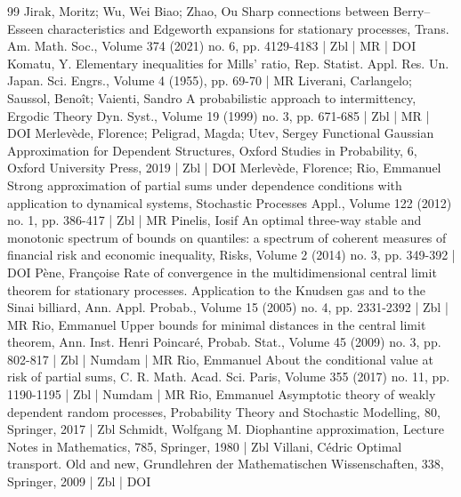 \begin{thebibliography}{99}
 Jirak, Moritz; Wu, Wei Biao; Zhao, Ou Sharp connections between Berry–Esseen characteristics and Edgeworth expansions for stationary processes, Trans. Am. Math. Soc., Volume 374 (2021) no. 6, pp. 4129-4183 | Zbl | MR | DOI
 Komatu, Y. Elementary inequalities for Mills’ ratio, Rep. Statist. Appl. Res. Un. Japan. Sci. Engrs., Volume 4 (1955), pp. 69-70 | MR
 Liverani, Carlangelo; Saussol, Benoît; Vaienti, Sandro A probabilistic approach to intermittency, Ergodic Theory Dyn. Syst., Volume 19 (1999) no. 3, pp. 671-685 | Zbl | MR | DOI
 Merlevède, Florence; Peligrad, Magda; Utev, Sergey Functional Gaussian Approximation for Dependent Structures, Oxford Studies in Probability, 6, Oxford University Press, 2019 | Zbl | DOI
 Merlevède, Florence; Rio, Emmanuel Strong approximation of partial sums under dependence conditions with application to dynamical systems, Stochastic Processes Appl., Volume 122 (2012) no. 1, pp. 386-417 | Zbl | MR
 Pinelis, Iosif An optimal three-way stable and monotonic spectrum of bounds on quantiles: a spectrum of coherent measures of financial risk and economic inequality, Risks, Volume 2 (2014) no. 3, pp. 349-392 | DOI
 Pène, Françoise Rate of convergence in the multidimensional central limit theorem for stationary processes. Application to the Knudsen gas and to the Sinai billiard, Ann. Appl. Probab., Volume 15 (2005) no. 4, pp. 2331-2392 | Zbl | MR
 Rio, Emmanuel Upper bounds for minimal distances in the central limit theorem, Ann. Inst. Henri Poincaré, Probab. Stat., Volume 45 (2009) no. 3, pp. 802-817 | Zbl | Numdam | MR
 Rio, Emmanuel About the conditional value at risk of partial sums, C. R. Math. Acad. Sci. Paris, Volume 355 (2017) no. 11, pp. 1190-1195 | Zbl | Numdam | MR
 Rio, Emmanuel Asymptotic theory of weakly dependent random processes, Probability Theory and Stochastic Modelling, 80, Springer, 2017 | Zbl
 Schmidt, Wolfgang M. Diophantine approximation, Lecture Notes in Mathematics, 785, Springer, 1980 | Zbl
 Villani, Cédric Optimal transport. Old and new, Grundlehren der Mathematischen Wissenschaften, 338, Springer, 2009 | Zbl | DOI
\end{thebibliography}
